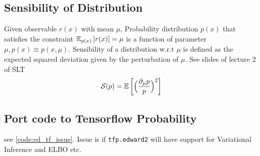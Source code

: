 \documentclass[summaries.tex]{subfiles}
\begin{document}
\subsection{Sensibility of Distribution}
Given observable $r(x)$ with mean $\mu$, Probability distribution $p(x)$
that satisfies the constraint $\mathbb{E}_{p(x)}\left[r(x)\right] = \mu$ is a function of parameter
$\mu, p(x) \equiv p(x, \mu)$. Sensibility of a distribution w.r.t $\mu$ is 
defined as the expected squared deviation given by the perturbation of $\mu$.
See slides of lecture 2 of SLT 
$$
\mathcal{S}(p) = \mathbb{E}\left[\Big(\frac{\partial_{\mu} p}{p}\Big)^2\right]
$$

\subsection{Port code to Tensorflow Probability}
see \ref{code:ed_tf_issue}. Issue is if \texttt{tfp.edward2} will have support
for Variational Inference and ELBO etc.

\biblio
\end{document}
